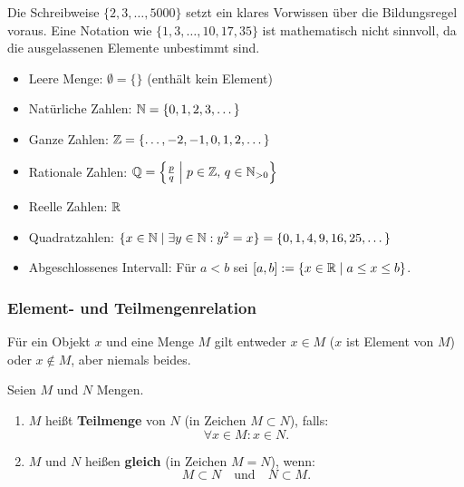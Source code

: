 \begin{bemerkung}[Auslassungspunkte]
Die Schreibweise $\{2, 3, \dots, 5000\}$ setzt ein klares Vorwissen über die Bildungsregel voraus. Eine Notation wie $\{1, 3, \dots, 10, 17, 35\}$ ist mathematisch nicht sinnvoll, da die ausgelassenen Elemente unbestimmt sind.
\end{bemerkung}

\begin{beispiel}[Standardmengen]
\begin{itemize}
    \item Leere Menge: $\emptyset = \{\}$ (enthält kein Element)
    \item Natürliche Zahlen: $\mathbb{N} = \{0, 1, 2, 3, \dots\}$
    \item Ganze Zahlen: $\mathbb{Z} = \{\dots, -2, -1, 0, 1, 2, \dots\}$
    \item Rationale Zahlen: $\mathbb{Q} = \left\{ \frac{p}{q} \;\middle|\; p \in \mathbb{Z}, \, q \in \mathbb{N}_{>0} \right\}$
    \item Reelle Zahlen: $\mathbb{R}$
    \item Quadratzahlen: $\{x \in \mathbb{N} \mid \exists y \in \mathbb{N} : y^2 = x\} = \{0, 1, 4, 9, 16, 25, \dots\}$
    \item Abgeschlossenes Intervall: Für $a < b$ sei $[a, b] := \{x \in \mathbb{R} \mid a \le x \le b\}$.
\end{itemize}
\end{beispiel}

\subsubsection*{Element- und Teilmengenrelation}

Für ein Objekt $x$ und eine Menge $M$ gilt entweder $x \in M$ ($x$ ist Element von $M$) oder $x \notin M$, aber niemals beides.

\begin{definition}
Seien $M$ und $N$ Mengen.
\begin{enumerate}
    \item $M$ heißt \textbf{Teilmenge} von $N$ (in Zeichen $M \subset N$), falls:
    \[
    \forall x \in M : x \in N.
    \]
    \item $M$ und $N$ heißen \textbf{gleich} (in Zeichen $M = N$), wenn:
    \[
    M \subset N \quad \text{und} \quad N \subset M.
    \]
\end{enumerate}
\end{definition}

